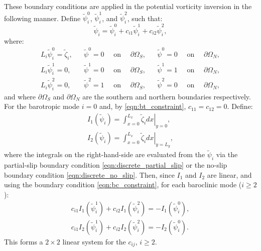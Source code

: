 \documentclass[a4paper]{book}
\begin{document}
These boundary conditions are applied in the potential vorticity inversion in
the following manner. Define $\tilde{\psi}^0_i$, $\tilde{\psi}^1_i$, and
$\tilde{\psi}^2_i$, such that:
\begin{equation}\label{eqn:channel_decomposition}
  \tilde{\psi}_i = \tilde{\psi}^0_i + c_{i1} \tilde{\psi}^1_i + c_{i2} \tilde{\psi}^2_i,
\end{equation}
where:
\begin{align}
  L_i \tilde{\psi}^0_i = \tilde{\zeta}_i, & & \tilde{\psi}^0 = 0 \quad \textrm{ on } \quad \partial \Omega_S, & & \tilde{\psi}^0 = 0 \quad \textrm{ on } \quad \partial \Omega_N, \nonumber \\
  L_i \tilde{\psi}^1_i = 0,               & & \tilde{\psi}^1 = 0 \quad \textrm{ on } \quad \partial \Omega_S, & & \tilde{\psi}^1 = 1 \quad \textrm{ on } \quad \partial \Omega_N, \nonumber \\
  L_i \tilde{\psi}^2_i = 0,               & & \tilde{\psi}^2 = 1 \quad \textrm{ on } \quad \partial \Omega_S, & & \tilde{\psi}^2 = 0 \quad \textrm{ on } \quad \partial \Omega_N,
\end{align}
and where $\partial \Omega_S$ and $\partial \Omega_N$ are the southern and
northern boundaries respectively. For the barotropic mode $i = 0$ and, by
\eqref{eqn:bt_constraint}, $c_{11} = c_{12} = 0$. Define:
\begin{align}
  I_1 \left( \tilde{\psi}_i \right) = \left. \int_{x = 0}^{L_x} \tilde{\zeta}_i dx \right|_{y = 0}, \nonumber \\
  I_2 \left( \tilde{\psi}_i \right) = \left. \int_{x = 0}^{L_x} \tilde{\zeta}_i dx \right|_{y = L_y},
\end{align}
where the integrals on the right-hand-side are evaluated from the
$\tilde{\psi}_i$ via the partial-slip boundary condition \eqref{eqn:discrete_partial_slip}
or the no-slip boundary condition \eqref{eqn:discrete_no_slip}.
Then, since $I_1$ and $I_2$ are linear, and using the boundary condition
\eqref{eqn:bc_constraint}, for each baroclinic mode ($i \geq 2$):
\begin{align}
  c_{i1} I_1 \left( \tilde{\psi}^1_i \right) + c_{i2} I_1 \left( \tilde{\psi}^2_i \right) = - I_1 \left( \tilde{\psi}^0_i \right), \nonumber \\
  c_{i1} I_2 \left( \tilde{\psi}^1_i \right) + c_{i2} I_2 \left( \tilde{\psi}^2_i \right) = - I_2 \left( \tilde{\psi}^0_i \right).
\end{align}
This forms a $2 \times 2$ linear system for the $c_{ij}$,
$i \geq 2$.
\end{document}
